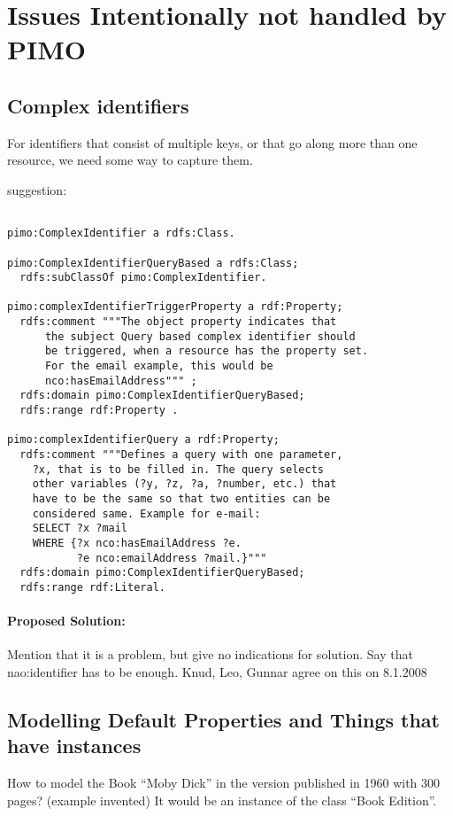 \section{Issues Intentionally not handled by PIMO}

\subsection{Complex identifiers}
For identifiers that consist of multiple keys, or that go along more than one resource,
we need some way to capture them.

suggestion:
{\small
\begin{verbatim}

pimo:ComplexIdentifier a rdfs:Class.

pimo:ComplexIdentifierQueryBased a rdfs:Class;
  rdfs:subClassOf pimo:ComplexIdentifier.
  
pimo:complexIdentifierTriggerProperty a rdf:Property;
  rdfs:comment """The object property indicates that 
      the subject Query based complex identifier should 
      be triggered, when a resource has the property set. 
      For the email example, this would be 
      nco:hasEmailAddress""" ;
  rdfs:domain pimo:ComplexIdentifierQueryBased;
  rdfs:range rdf:Property .
  
pimo:complexIdentifierQuery a rdf:Property;
  rdfs:comment """Defines a query with one parameter, 
    ?x, that is to be filled in. The query selects 
    other variables (?y, ?z, ?a, ?number, etc.) that 
    have to be the same so that two entities can be 
    considered same. Example for e-mail: 
    SELECT ?x ?mail 
    WHERE {?x nco:hasEmailAddress ?e. 
           ?e nco:emailAddress ?mail.}"""
  rdfs:domain pimo:ComplexIdentifierQueryBased;
  rdfs:range rdf:Literal.
\end{verbatim}
}

\paragraph{Proposed Solution:} Mention that it is a problem, but give no indications for solution. Say that nao:identifier has to be enough.
Knud, Leo, Gunnar agree on this on 8.1.2008

\subsection{Modelling Default Properties and Things that have instances}
How to model the Book ``Moby Dick'' in the version published in
1960 with 300 pages? (example invented) 
It would be an instance of the class ``Book Edition''.

